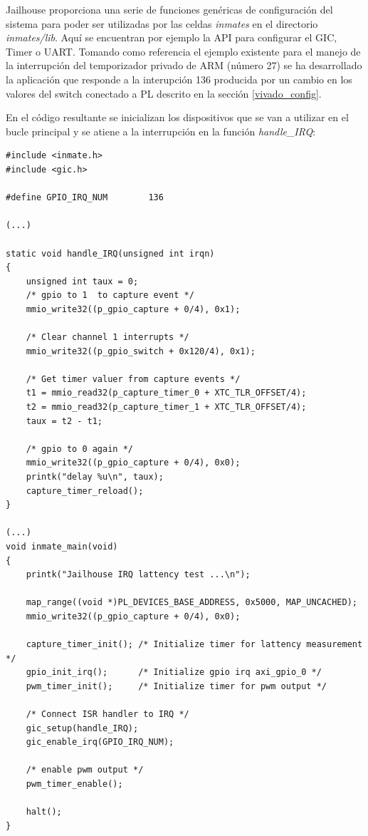 Jailhouse proporciona una serie de funciones genéricas de configuración del sistema para poder ser utilizadas por las celdas \textit{inmates} en el directorio \textit{inmates/lib}. Aquí se encuentran por ejemplo la API para configurar el \acrshort{GIC}, Timer o \acrshort{UART}. Tomando como referencia el ejemplo existente para el manejo de la interrupción del temporizador privado de ARM (número 27) se ha desarrollado la aplicación que responde a la interupción 136 producida por un cambio en los valores del switch conectado a \acrshort{PL} descrito en la sección \ref{vivado_config}.

En el código resultante se inicializan los dispositivos que se van a utilizar en el bucle principal y se atiene a la interrupción en la función \textit{handle\_IRQ}:
\begin{lstlisting}[style=CStyle]
#include <inmate.h>
#include <gic.h>

#define GPIO_IRQ_NUM		136

(...)

static void handle_IRQ(unsigned int irqn)
{
    unsigned int taux = 0;
    /* gpio to 1  to capture event */
    mmio_write32((p_gpio_capture + 0/4), 0x1);

    /* Clear channel 1 interrupts */
    mmio_write32((p_gpio_switch + 0x120/4), 0x1);

    /* Get timer valuer from capture events */
    t1 = mmio_read32(p_capture_timer_0 + XTC_TLR_OFFSET/4);
    t2 = mmio_read32(p_capture_timer_1 + XTC_TLR_OFFSET/4);
    taux = t2 - t1;

    /* gpio to 0 again */
    mmio_write32((p_gpio_capture + 0/4), 0x0);
    printk("delay %u\n", taux);
    capture_timer_reload();
}

(...)
void inmate_main(void)
{
    printk("Jailhouse IRQ lattency test ...\n");

    map_range((void *)PL_DEVICES_BASE_ADDRESS, 0x5000, MAP_UNCACHED);
    mmio_write32((p_gpio_capture + 0/4), 0x0);

    capture_timer_init(); /* Initialize timer for lattency measurement */
    gpio_init_irq();      /* Initialize gpio irq axi_gpio_0 */
    pwm_timer_init();     /* Initialize timer for pwm output */

    /* Connect ISR handler to IRQ */
    gic_setup(handle_IRQ);
    gic_enable_irq(GPIO_IRQ_NUM);

    /* enable pwm output */
    pwm_timer_enable();

    halt();
}

\end{lstlisting}

